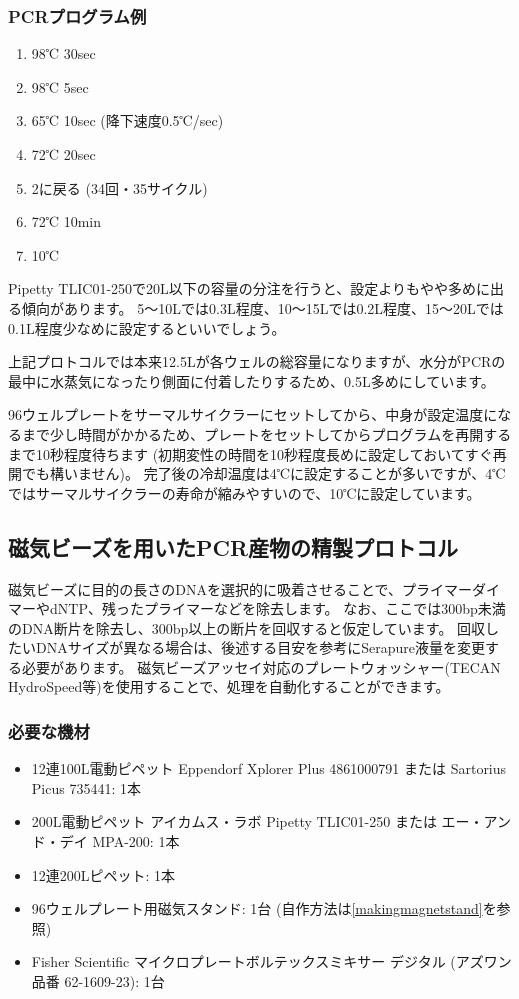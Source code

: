 \documentclass[titlepage,10pt,a4paper,uplatex]{jsbook}
\begin{document}
\subsubsection{PCRプログラム例}
\begin{enumerate}
\item 98℃ 30sec
\item 98℃ 5sec
\item 65℃ 10sec (降下速度0.5℃/sec)
\item 72℃ 20sec
\item 2に戻る (34回・35サイクル)
\item 72℃ 10min
\item 10℃
\end{enumerate}

Pipetty TLIC01-250で20{\textmu}L以下の容量の分注を行うと、設定よりもやや多めに出る傾向があります。
5～10{\textmu}Lでは0.3{\textmu}L程度、10～15{\textmu}Lでは0.2{\textmu}L程度、15～20{\textmu}Lでは0.1{\textmu}L程度少なめに設定するといいでしょう。

上記プロトコルでは本来12.5{\textmu}Lが各ウェルの総容量になりますが、水分がPCRの最中に水蒸気になったり側面に付着したりするため、0.5{\textmu}L多めにしています。

96ウェルプレートをサーマルサイクラーにセットしてから、中身が設定温度になるまで少し時間がかかるため、プレートをセットしてからプログラムを再開するまで10秒程度待ちます (初期変性の時間を10秒程度長めに設定しておいてすぐ再開でも構いません)。
完了後の冷却温度は4℃に設定することが多いですが、4℃ではサーマルサイクラーの寿命が縮みやすいので、10℃に設定しています。

\subsection{磁気ビーズを用いたPCR産物の精製プロトコル}

磁気ビーズに目的の長さのDNAを選択的に吸着させることで、プライマーダイマーやdNTP、残ったプライマーなどを除去します。
なお、ここでは300bp未満のDNA断片を除去し、300bp以上の断片を回収すると仮定しています。
回収したいDNAサイズが異なる場合は、後述する目安を参考にSerapure液量を変更する必要があります。
磁気ビーズアッセイ対応のプレートウォッシャー(TECAN HydroSpeed等)を使用することで、処理を自動化することができます。

\subsubsection{必要な機材}
\begin{itemize}
\item 12連100{\textmu}L電動ピペット Eppendorf Xplorer Plus 4861000791 または Sartorius Picus 735441: 1本
\item 200{\textmu}L電動ピペット アイカムス・ラボ Pipetty TLIC01-250 または エー・アンド・デイ MPA-200: 1本
\item 12連200{\textmu}Lピペット: 1本
\item 96ウェルプレート用磁気スタンド: 1台 (自作方法は\ref{makingmagnetstand}を参照)
\item Fisher Scientific マイクロプレートボルテックスミキサー デジタル (アズワン品番 62-1609-23): 1台
\end{itemize}
\end{document}
